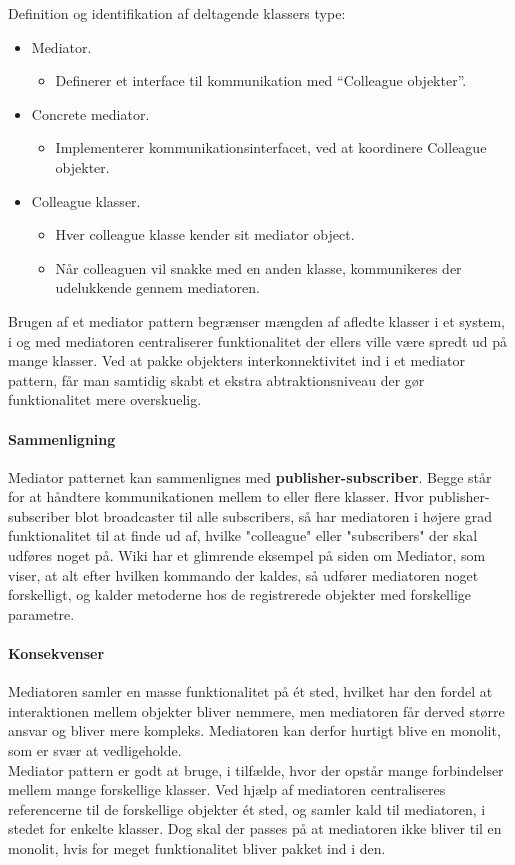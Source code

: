 Definition og identifikation af deltagende klassers type:

\begin{itemize}
	\item Mediator.
	\begin{itemize}
		\item 	Definerer et interface til kommunikation med “Colleague objekter”.
	\end{itemize}
	\item Concrete mediator.
	\begin{itemize}
		\item 	Implementerer kommunikationsinterfacet, ved at koordinere Colleague objekter.
	\end{itemize}
	\item Colleague klasser.
	\begin{itemize}
		\item Hver colleague klasse kender sit mediator object.
		\item Når colleaguen vil snakke med en anden klasse, kommunikeres der udelukkende gennem mediatoren.
	\end{itemize}
\end{itemize}

Brugen af et mediator pattern begrænser mængden af afledte klasser i et system, i og med mediatoren centraliserer funktionalitet der ellers ville være spredt ud på mange klasser. Ved at pakke objekters interkonnektivitet ind i et mediator pattern, får man samtidig skabt et ekstra abtraktionsniveau der gør funktionalitet mere overskuelig.

\paragraph{Sammenligning}
Mediator patternet kan sammenlignes med \textbf{publisher-subscriber}. Begge står for at håndtere kommunikationen mellem to eller flere klasser. Hvor publisher-subscriber blot broadcaster til alle subscribers, så har mediatoren i højere grad funktionalitet til at finde ud af, hvilke "colleague" eller "subscribers" der skal udføres noget på. Wiki har et glimrende eksempel på siden om Mediator, som viser, at alt efter hvilken kommando der kaldes, så udfører mediatoren noget forskelligt, og kalder metoderne hos de registrerede objekter med forskellige parametre.

\paragraph{Konsekvenser}
Mediatoren samler en masse funktionalitet på ét sted, hvilket har den fordel at interaktionen mellem objekter bliver nemmere, men mediatoren får derved større ansvar og bliver mere kompleks. Mediatoren kan derfor hurtigt blive en monolit, som er svær at vedligeholde.\\

Mediator pattern er godt at bruge, i tilfælde, hvor der opstår mange forbindelser mellem mange forskellige klasser. Ved hjælp af mediatoren centraliseres referencerne til de forskellige objekter ét sted, og samler kald til mediatoren, i stedet for enkelte klasser. Dog skal der passes på at mediatoren ikke bliver til en monolit, hvis for meget funktionalitet bliver pakket ind i den.
